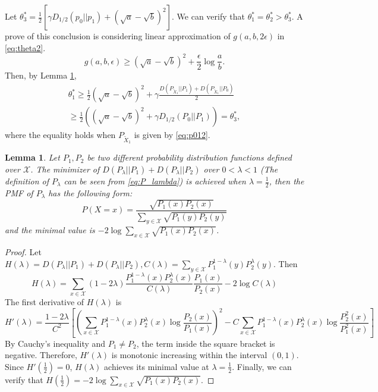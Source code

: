 \documentclass{article}
\newtheorem{lemma}{Lemma}
\begin{document}
Let $\theta^*_3 = \frac{1}{2}[\gamma D_{1/2}(p_0||p_1) + (\sqrt{a} - \sqrt{b})^2]$.
We can verify that $\theta_1^*=\theta_2^*>\theta^*_3$.
A prove of this conclusion is considering
linear approximation of $g(a,b,2\epsilon)$
in \eqref{eq:theta2}.
\begin{equation}\label{eq:g_linear}
		g(a,b,\epsilon) \geq  (\sqrt{a} - \sqrt{b})^2 + \frac{\epsilon}{2}\log \frac{a}{b}. 
	\end{equation}
	Then, by Lemma \ref{lem:p0p12},
	\begin{align*}
		\theta^*_1 \geq \frac{1}{2}(\sqrt{a}-\sqrt{b})^2+\gamma \frac{D(P_{\widetilde{X}_1} || P_1) + D(P_{\widetilde{X}_1} || P_0)}{2} \\
		\geq \frac{1}{2}((\sqrt{a}-\sqrt{b})^2+\gamma D_{1/2}(P_0||P_1))=\theta^*_3,
	\end{align*}
	where the equality holds when $P_{\widetilde{X}_1}$ is given by \eqref{eq:p012}. 
	\begin{lemma}\label{lem:p0p12}
		Let $P_1, P_2$ be two different
        probability distribution functions defined over $\mathcal{X}$.
        The minimizer
		of $D(P_{\lambda}||P_1) + 
        D(P_{\lambda}||P_2)$ 
        over $0<\lambda < 1$
        (The definition of $P_{\lambda}$
        can be seen from \eqref{eq:P_lambda})
        is achieved when $\lambda=\frac{1}{2}$,
        then the PMF of $P_{\lambda}$ has the following form:
		\begin{equation}\label{eq:p012}
			P(X=x)=\frac{\sqrt{P_1(x)
            P_2(x)}}
            { \sum_{y\in \mathcal{X}} 
            \sqrt{P_1(y)
                P_2(y)}
            }
		\end{equation}
		and the minimal value is
		$-2\log \sum_{x\in \mathcal{X}} 
        \sqrt{P_1(x) P_2(x)}$.
	\end{lemma}
\begin{proof}
    Let $H(\lambda)=D(P_{\lambda}||P_1) + 
    D(P_{\lambda}||P_2), C(\lambda)=\sum_{y \in \mathcal{X}}
    P_1^{1-\lambda}(y)
    P_2^{\lambda} (y)$.
    Then
    \begin{equation}
        H(\lambda)
        = \sum_{x\in \mathcal{X}}
        (1-2\lambda)\frac{P^{1-\lambda}_1(x)P^{\lambda}_2(x)}
        {C(\lambda)}\frac{P_1(x)}
        {P_2(x)} - 2 \log C(\lambda)
    \end{equation}
    The first derivative of $H(\lambda)$ is
    \begin{equation}
        H'(\lambda) = \frac{1-2\lambda}{C^2}
        \left[
            \left(\sum_{x\in \mathcal{X}}
            P_1^{1-\lambda}(x)
            P_2^{\lambda}(x) \log\frac{P_2(x)}{P_1(x)}
            \right)^2
            - C \sum_{x\in \mathcal{X}}P_1^{1-\lambda}(x)
            P_2^{\lambda}(x) \log\frac{P^2_2(x)}{P^2_1(x)}
        \right]
    \end{equation}
    By Cauchy's inequality and $P_1\neq P_2$,
    the term inside the
    square bracket is negative.
    Therefore, $H'(\lambda)$ is monotonic increasing within
    the interval $(0,1)$. Since $H'(\frac{1}{2})=0$,
    $H(\lambda)$ achieves its minimal value at $\lambda=\frac{1}{2}$.
    Finally, we can verify that 
    $H(\frac{1}{2})=-2\log \sum_{x\in \mathcal{X}} 
    \sqrt{P_1(x) P_2(x)}$.
\end{proof}
\end{document}

